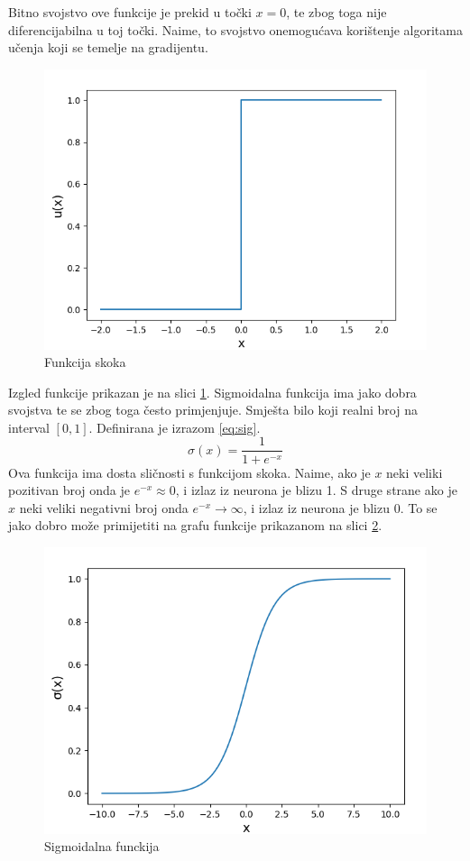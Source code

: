 \documentclass[times, utf8, zavrsni, numeric]{fer}
\begin{document}
Bitno svojstvo ove funkcije je prekid u točki $x=0$, te zbog toga nije 
diferencijabilna u toj točki. Naime, to svojstvo onemogućava korištenje 
algoritama učenja koji se temelje na gradijentu. 
\begin{figure}[htb]
	\centering
	\includegraphics[scale=0.35]{step_fun.png}
	\caption{Funkcija skoka}
	\label{fig:step_fun}
\end{figure}
Izgled funkcije prikazan je na slici 
\ref{fig:step_fun}.
\newpage
Sigmoidalna funkcija ima jako dobra svojstva te se zbog toga često primjenjuje.
Smješta bilo koji realni broj na interval $[0, 1]$. Definirana je izrazom 
\ref{eq:sig}.
\begin{equation}
	\sigma(x)=\frac{1}{1+e^{-x}}
	\label{eq:sig}
\end{equation}
Ova funkcija ima dosta sličnosti s funkcijom skoka. Naime, ako je $x$ neki 
veliki pozitivan broj onda je $e^{-x} \approx 0$, i izlaz iz neurona je blizu
1. S druge strane ako je $x$ neki veliki negativni broj onda $e^{-x} \to 
\infty$, i izlaz iz neurona je blizu 0. To se jako dobro može primijetiti na
grafu funkcije prikazanom na slici \ref{fig:sig_fun}.
\begin{figure}[htb]
	\centering
	\includegraphics[scale=0.35]{sig_fun.png}
	\caption{Sigmoidalna funckija}
	\label{fig:sig_fun}
\end{figure}
\end{document}
